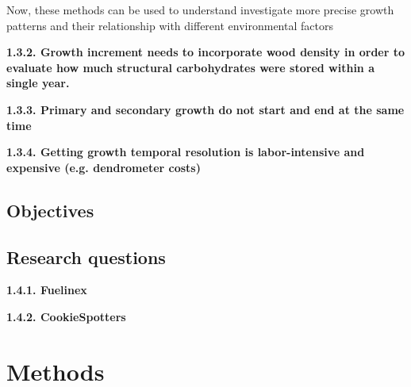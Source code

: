 \documentclass{article}
\begin{document}
Now, these methods can be used to understand investigate more precise growth patterns and their relationship with different environmental factors

\textbf{1.3.2. Growth increment needs to incorporate wood density in order to evaluate how much structural carbohydrates were stored within a single year.}

\textbf{1.3.3. Primary and secondary growth do not start and end at the same time}

\textbf{1.3.4. Getting growth temporal resolution is labor-intensive and expensive (e.g. dendrometer costs)}




\subsection{Objectives} 

\subsection {Research questions} 

\textbf{1.4.1. Fuelinex}

\textbf{1.4.2. CookieSpotters}


\section{Methods}
\end{document}
